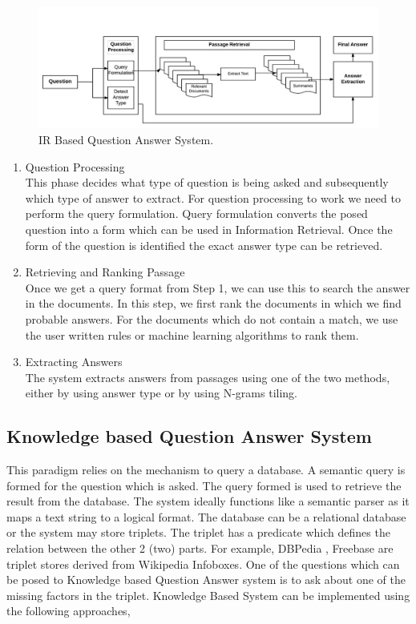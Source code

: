 \begin{figure}[htb]
\centering
\includegraphics[scale=0.8]{images/IR_BasedQA.jpg}
\caption{IR Based Question Answer System.} 
\label{fig:IR_BasedQA}
\end{figure}

\begin{enumerate}	
\item Question Processing \\
This phase decides what type of question is being asked and subsequently which type of answer to 
extract. For question processing to work we need to perform the query formulation. Query formulation converts the posed question into a form which can be used in Information Retrieval. Once the form of the question is identified the exact answer type can be retrieved. 
	
\item Retrieving and Ranking Passage \\
Once we get a query format from Step 1, we can use this to search the answer in the documents.
In this step, we first rank the documents in which we find probable answers. For the documents which do not contain a match, we use the user written rules or machine learning algorithms to rank them.

\break
\item Extracting Answers \\
The system extracts answers from passages using one of the two methods, either by using answer type or by using N-grams tiling.
\end{enumerate}

\subsection{Knowledge based Question Answer System}
This paradigm relies on the mechanism to query a database. A semantic query is formed for the question which is asked. The query formed is used to retrieve the result from the database. The system ideally functions like a semantic parser as it maps a text string to a logical format. The database can be a relational database or the system may store triplets. The triplet has a predicate which defines the relation between the other 2 (two) parts. For example, DBPedia \cite{auer2007dbpedia}, Freebase \cite {bollacker2008freebase} are triplet stores derived from Wikipedia Infoboxes. One of the questions which can be posed to Knowledge based Question Answer system is to ask about one of the missing factors in the triplet. Knowledge Based System can be implemented using the following approaches,

